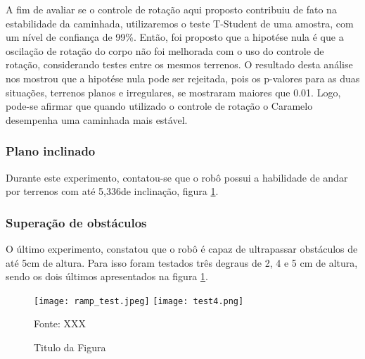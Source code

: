 \documentclass[../main.tex]{subfiles}
\begin{document}
  A fim de avaliar se o controle de rotação aqui proposto contribuiu de fato na estabilidade da caminhada, utilizaremos o teste T-Student de uma amostra, com um nível de confiança de 99\%. Então, foi proposto que a hipotése nula é que a oscilação de rotação do corpo não foi melhorada com o uso do controle de rotação, considerando testes entre os mesmos terrenos. O resultado desta análise nos mostrou que a hipotése nula pode ser rejeitada, pois os p-valores para as duas situações, terrenos planos e irregulares, se mostraram maiores que 0.01. Logo, pode-se afirmar que quando utilizado o controle de rotação o Caramelo desempenha uma caminhada mais estável.
  
  \subsubsection{Plano inclinado}
  Durante este experimento, contatou-se que o robô possui a habilidade de andar por terrenos com até 5,336\degree de inclinação, figura \ref{fig:tests3-4}. 

  \subsubsection{Superação de obstáculos}
  O último experimento, constatou que o robô é capaz de ultrapassar obstáculos de até 5cm de altura. Para isso foram testados três degraus de 2, 4 e 5 cm de altura, sendo os dois últimos apresentados na figura \ref{fig:tests3-4}.

  \begin{figure}[h]
    \centering
    \caption{Titulo da Figura}
    \texttt{[image: ramp\_test.jpeg]}
    \texttt{[image: test4.png]}

    Fonte: XXX
    \label{fig:tests3-4}
  \end{figure}

   
\end{document}
